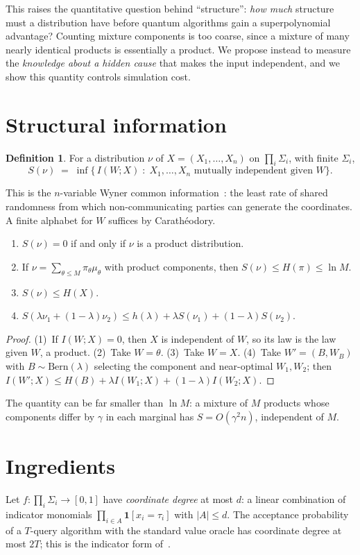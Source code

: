 \documentclass[11pt]{article}
\theoremstyle{definition}\newtheorem{definition}[theorem]{Definition}\newtheorem{problem}{Open Problem}
\theoremstyle{remark}\newtheorem{remark}[theorem]{Remark}
\begin{document}
This raises the quantitative question behind ``structure'': \emph{how much} structure must a distribution have before quantum algorithms gain a superpolynomial advantage? Counting mixture components is too coarse, since a mixture of many nearly identical products is essentially a product. We propose instead to measure the \emph{knowledge about a hidden cause} that makes the input independent, and we show this quantity controls simulation cost.

\section{Structural information}
\begin{definition}
For a distribution $\nu$ of $X=(X_1,\dots,X_n)$ on $\prod_i\Sigma_i$, with finite $\Sigma_i$,
\[ S(\nu)\;=\;\inf\bigl\{\, I(W;X)\;:\; X_1,\dots,X_n \text{ mutually independent given } W \bigr\}. \]
\end{definition}
This is the $n$-variable Wyner common information~\cite{Wyn75,LXC10}: the least rate of shared randomness from which non-communicating parties can generate the coordinates. A finite alphabet for $W$ suffices by Carath\'eodory.

\begin{proposition}\label{prop:basic}
\begin{enumerate}[nosep]
\item $S(\nu)=0$ if and only if $\nu$ is a product distribution.
\item If $\nu=\sum_{\theta\le M}\pi_\theta\mu_\theta$ with product components, then $S(\nu)\le H(\pi)\le\ln M$.
\item $S(\nu)\le H(X)$.
\item $S(\lambda\nu_1+(1-\lambda)\nu_2)\le h(\lambda)+\lambda S(\nu_1)+(1-\lambda)S(\nu_2)$.
\end{enumerate}
\end{proposition}
\begin{proof}
(1)~If $I(W;X)=0$, then $X$ is independent of $W$, so its law is the law given $W$, a product. (2)~Take $W=\theta$. (3)~Take $W=X$. (4)~Take $W'=(B,W_B)$ with $B\sim\mathrm{Bern}(\lambda)$ selecting the component and near-optimal $W_1,W_2$; then $I(W';X)\le H(B)+\lambda I(W_1;X)+(1-\lambda)I(W_2;X)$.
\end{proof}
The quantity can be far smaller than $\ln M$: a mixture of $M$ products whose components differ by $\gamma$ in each marginal has $S=O(\gamma^2 n)$, independent of $M$.

\section{Ingredients}\label{sec:ingredients}
Let $f:\prod_i\Sigma_i\to[0,1]$ have \emph{coordinate degree} at most $d$: a linear combination of indicator monomials $\prod_{i\in A}\mathbf 1[x_i=\tau_i]$ with $|A|\le d$. The acceptance probability of a $T$-query algorithm with the standard value oracle has coordinate degree at most $2T$; this is the indicator form of~\cite{BBCMW01}.
\end{document}
